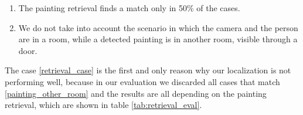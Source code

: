 \begin{enumerate}[label=\alph*)]
    \item \label{retrieval_case} The painting retrieval finds a match only in 50\% of the cases.
    \item \label{painting_other_room} We do not take into account the scenario in which the camera and the person are in a room, while a detected painting is in another room, visible through a door.
\end{enumerate}

The case \ref*{retrieval_case} is the first and only reason why our localization is not performing well, because in our evaluation we discarded all cases that match \ref*{painting_other_room} and the results are all depending on the painting retrieval, which are shown in table \ref{tab:retrieval_eval}.
